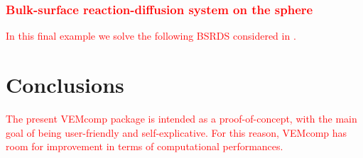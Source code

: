 \documentclass[a4paper]{article}
\newcommand{\red}[1]{\textcolor{red}{#1}}
\begin{document}
\subsubsection{\red{Bulk-surface reaction-diffusion system on the sphere}}
\label{sec:example_bsrds_sphere}
\red{In this final example we solve the following BSRDS considered in \cite{frittelli2023bsrds}.}


\section{Conclusions}
\label{sec:conclusions}
\red{The present VEMcomp package is intended as a proof-of-concept,  with the main goal of being user-friendly and self-explicative. For this reason,  VEMcomp has room for improvement in terms of computational performances. }
 


 
\end{document}
